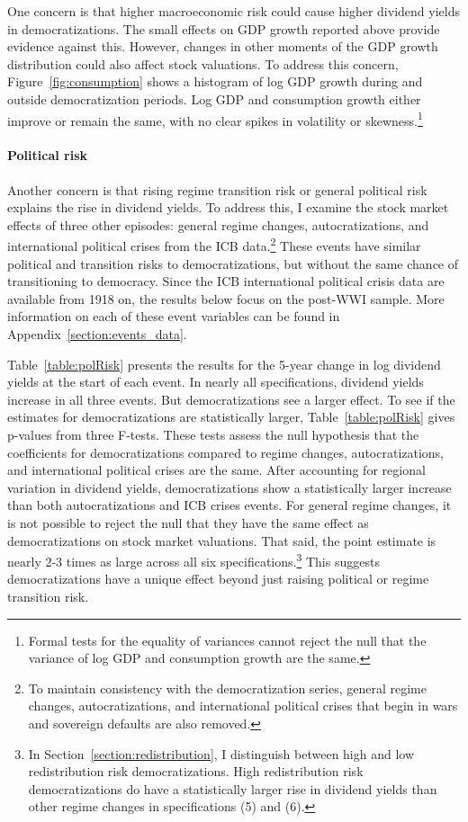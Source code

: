 One concern is that higher macroeconomic risk could cause higher dividend yields in democratizations. The small effects on GDP growth reported above provide evidence against this. However, changes in other moments of the GDP growth distribution could also affect stock valuations. To address this concern, Figure~\ref{fig:consumption} shows a histogram of log GDP growth during and outside democratization periods. Log GDP and consumption growth either improve or remain the same, with no clear spikes in volatility or skewness.\footnote{Formal tests for the equality of variances cannot reject the null that the variance of log GDP and consumption growth are the same.}



\paragraph{Political risk}
Another concern is that rising regime transition risk or general political risk explains the rise in dividend yields. To address this, I examine the stock market effects of three other episodes: general regime changes, autocratizations, and international political crises from the ICB data.\footnote{To maintain consistency with the democratization series, general regime changes, autocratizations, and international political crises that begin in wars and sovereign defaults are also removed.} These events have similar political and transition risks to democratizations, but without the same chance of transitioning to democracy. Since the ICB international political crisis data are available from 1918 on, the results below focus on the post-WWI sample. More information on each of these event variables can be found in Appendix~\ref{section:events_data}.

Table~\ref{table:polRisk} presents the results for the 5-year change in log dividend yields at the start of each event.  In nearly all specifications, dividend yields increase in all three events. But democratizations see a larger effect. To see if the estimates for democratizations are statistically larger, Table~\ref{table:polRisk} gives p-values from three F-tests. These tests assess the null hypothesis that the coefficients for democratizations compared to regime changes, autocratizations, and international political crises are the same. After accounting for regional variation in dividend yields, democratizations show a statistically larger increase than both autocratizations and ICB crises events. For general regime changes, it is not possible to reject the null that they have the same effect as democratizations on stock market valuations. That said, the point estimate is nearly 2-3 times as large across all six specifications.\footnote{In Section~\ref{section:redistribution}, I distinguish between high and low redistribution risk democratizations. High redistribution risk democratizations do have a statistically larger rise in dividend yields than other regime changes in specifications (5) and (6).} This suggests democratizations have a unique effect beyond just raising political or regime transition risk. 

